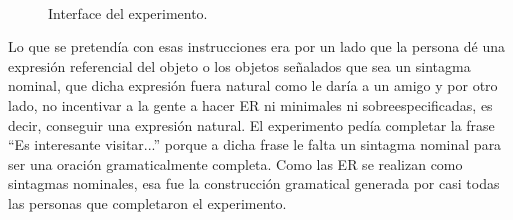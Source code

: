 \begin{figure}[H]
\begin{center}
\\[0pt]
\caption{Interface del experimento.}
\label{fig_interface}
\end{center}
\end{figure}


Lo que se pretend\'ia con esas instrucciones era por un lado que la persona d\'e una expresi\'on referencial del objeto o los objetos se\~nalados que sea un sintagma nominal, que dicha expresi\'on fuera natural como le dar\'ia a un amigo y por otro lado, no incentivar a la gente a hacer ER ni minimales ni sobreespecificadas, es decir, conseguir una expresi\'on natural. 
El experimento ped\'ia completar la frase ``Es interesante visitar...'' porque a dicha frase le falta un sintagma nominal para ser una oraci\'on gramaticalmente completa. Como las ER se realizan como sintagmas nominales, esa fue la construcci\'on gramatical generada por casi todas las personas que completaron el experimento.

